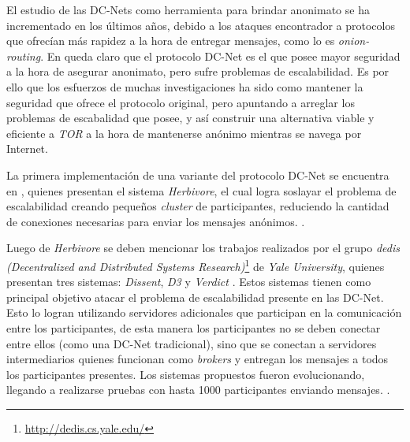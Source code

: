 El estudio de las DC-Nets como herramienta para brindar anonimato se ha incrementado en los últimos años, debido a los ataques 
encontrador a protocolos que ofrecían más rapidez a la hora de entregar mensajes, como lo es \emph{onion-routing}. En 
\cite{wright2002analysis} queda claro que el protocolo DC-Net es el que posee mayor seguridad a la hora de asegurar anonimato, 
pero sufre problemas de escalabilidad. Es por ello que los esfuerzos de muchas investigaciones ha sido como mantener la 
seguridad que ofrece el protocolo original, pero apuntando a arreglar los problemas de escabalidad que posee, y así construir 
una alternativa viable y eficiente a \emph{TOR} a la hora de mantenerse anónimo mientras se navega por Internet.

La primera implementación de una variante del protocolo DC-Net se encuentra en \cite{goel2003herbivore}, quienes presentan el 
sistema \emph{Herbivore}, el cual logra soslayar el problema de escalabilidad creando pequeños \emph{cluster} de participantes, 
reduciendo la cantidad de conexiones necesarias para enviar los mensajes anónimos. .

Luego de \emph{Herbivore} se deben mencionar los trabajos realizados por el grupo 
\emph{dedis (Decentralized and Distributed Systems Research)}\footnote{\url{http://dedis.cs.yale.edu/}} de \emph{Yale University}, 
quienes presentan tres sistemas: \emph{Dissent}, \emph{D3} y \emph{Verdict} 
\cite{corrigan2010dissent, wolinsky2012dissent, wolinsky2012scalable, corrigan2012proactively}. Estos sistemas tienen como principal 
objetivo atacar el problema de escalabilidad presente en las DC-Net. Esto lo logran utilizando servidores adicionales que participan 
en la comunicación entre los participantes, de esta manera los participantes no se deben conectar entre ellos (como una DC-Net tradicional), 
sino que se conectan a servidores intermediarios quienes funcionan como \emph{brokers} y entregan los mensajes a todos los participantes 
presentes. Los sistemas propuestos fueron evolucionando, llegando a realizarse pruebas con hasta 1000 participantes enviando mensajes. 
.



